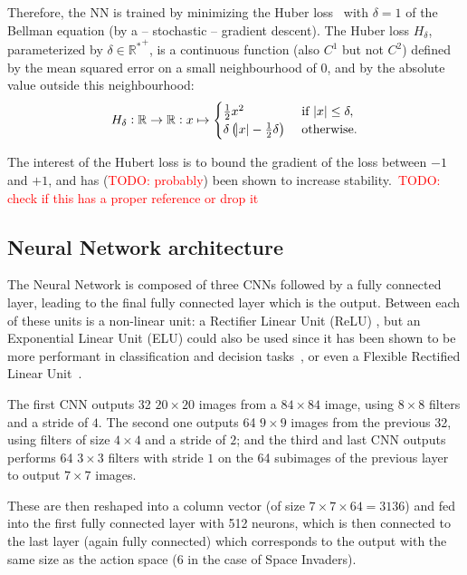 \documentclass[letterpaper]{article}
\newcommand\todo[1]{\textcolor{red}{TODO: #1}}
\begin{document}
Therefore, the NN is trained by minimizing the Huber loss~\citep{huber1964robust} with $\delta=1$ of the Bellman equation (by a -- stochastic -- gradient descent).
The Huber loss $H_\delta$, parameterized by $\delta \in {\mathbb R^*}^+$, is a continuous function (also $C^1$ but not $C^2$) defined by the mean
squared error on a small neighbourhood of $0$, and by the absolute value outside this neighbourhood:
\begin{equation}
	H_\delta : \mathbb R \to \mathbb R : x \mapsto \begin{cases}\frac 12x^2                                &\text{ if } \abs x \leq \delta,\\
	                                                            \delta\left(\abs x - \frac 12\delta\right) &\text{ otherwise.}\end{cases}
\end{equation}

The interest of the Hubert loss is to bound the gradient of the loss between $-1$ and $+1$, and has (\todo {probably}) been shown to increase
stability.~\todo{check if this has a proper reference or drop it}

\subsection{Neural Network architecture}

The Neural Network is composed of three CNNs followed by a fully connected layer, leading to the final fully connected layer which is the output.
Between each of these units is a non-linear unit: a Rectifier Linear Unit (ReLU) \citep{krizhevsky2012imagenet}, but an Exponential Linear Unit (ELU) could
also be used since it has been shown to be more performant in classification and decision tasks~\citep{DBLP:journals/corr/ClevertUH15}, or even a
Flexible Rectified Linear Unit~\citep{qiu2017flexible}.

The first CNN outputs 32 $20 \times 20$ images from a $84 \times 84$ image, using $8 \times 8$ filters and a stride of $4$. The second one outputs
64 $9 \times 9$ images from the previous 32, using filters of size $4 \times 4$ and a stride of $2$; and the third and last CNN outputs performs
64 $3 \times 3$ filters with stride $1$ on the 64 subimages of the previous layer to output $7 \times 7$ images.

These are then reshaped into a column vector (of size $7 \times 7 \times 64 = 3136$) and fed into the first fully connected layer with 512 neurons,
which is then connected to the last layer (again fully connected) which corresponds to the output with the same size as the action space (6 in the
case of Space Invaders).
\end{document}
